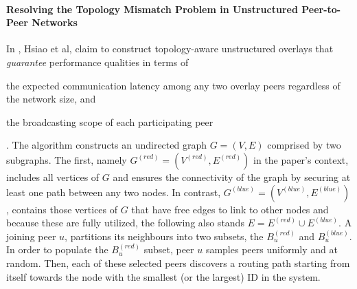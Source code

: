 \paragraph*{\bf Resolving the Topology Mismatch Problem in Unstructured
Peer-to-Peer Networks}

In \cite{hsiao_redblue_2009}, Hsiao et al, claim to construct topology-aware
unstructured overlays that \emph{guarantee} performance qualities in terms of
\begin{inparaenum}
  \item the expected communication latency among any two overlay peers
regardless of the network size, and
  \item the broadcasting scope of each participating peer
\end{inparaenum}
. The algorithm constructs an undirected graph $G = \left( V, E \right)$
comprised by two subgraphs. The first, namely $G^{\left( red \right)} = \left(
V^{\left( red \right)}, E^{\left( red \right)} \right)$ in the paper's context,
includes all vertices of $G$ and ensures the connectivity of the graph by
securing at least one path between any two nodes. In contrast, $G^{\left( blue
\right)} = \left( V^{\left( blue \right)}, E^{\left( blue \right)} \right)$,
contains those vertices of $G$ that have free edges to link to other nodes and
because these are fully utilized, the following also stands $E = E^{\left( red
\right)} \cup E^{\left( blue \right)}$. A joining peer $u$, partitions its
neighbours into two subsets, the $B_u^{\left( red \right)}$ and $B_u^{\left(
blue \right)}$. In order to populate the $B_u^{\left( red \right)}$ subset, peer
$u$ samples peers uniformly and at random. Then, each of these selected peers
discovers a routing path starting from itself towards the node with the smallest
(or the largest) ID in the system.

